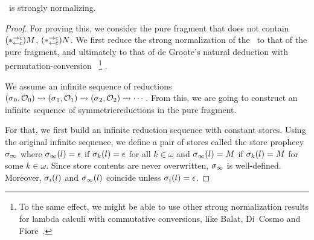 {\begin{theorem}
 \label{first:sn}
 \lgd\, is strongly normalizing.
\end{theorem}
\begin{proof}
For proving this, we consider the pure fragment
 that does not contain
$(\ast^{\rightarrow {\bar{c}}}_{\leftarrow{c}})M$, $(\ast^{\rightarrow {c}}_{\leftarrow{\bar{c}}})N$.
We first reduce the strong
normalization of the \lgd\, to that of the pure fragment, and
ultimately to that of de Groote's
natural deduction with permutation-conversion~\cite{Philippe2002js}%
\footnote{
To the
same effect, we might be able to use other strong normalization
 results for lambda calculi with commutative conversions, like Balat,
 Di~Cosmo
 and Fiore~\cite{bdf}.
}%
.

We assume an infinite sequence of reductions
$
({\sigma}{_0},{\mathcal{O}_0})
\rightsquigarrow
({\sigma}{_1},{\mathcal{O}_1})
\rightsquigarrow
({\sigma}{_2},{\mathcal{O}_2})
\rightsquigarrow\cdots
$.
From this, we are going to construct an infinite sequence of
symmetricreductions in the pure fragment.

For that, we first
build an infinite reduction sequence with constant stores.
Using the original infinite sequence, we define a pair of stores called the
store prophecy ${\sigma}_\infty$ where
$ {\sigma}_\infty(l)= \epsilon$ if ${\sigma}_k(l)=\epsilon$ for all
 $k\in\omega$ and
$ {\sigma}_\infty(l)=M $ if ${\sigma}_k(l)=M$ for some $k\in\omega$.
Since store contents are never overwritten,
${\sigma}_\infty$ is well-defined.
Moreover,
${\sigma}_i(l)$ and ${\sigma}_\infty(l)$ coincide unless
${\sigma}_i(l)=\epsilon$.


\end{proof}}
